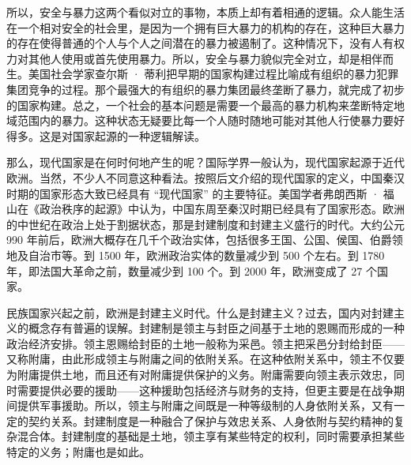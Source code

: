 所以，安全与暴力这两个看似对立的事物，本质上却有着相通的逻辑。众人能生活在一个相对安全的社会里，是因为一个拥有巨大暴力的机构的存在，这种巨大暴力的存在使得普通的个人与个人之间潜在的暴力被遏制了。这种情况下，没有人有权力对其他人使用或首先使用暴力。所以，安全与暴力貌似完全对立，却是相伴而生。美国社会学家查尔斯 · 蒂利把早期的国家构建过程比喻成有组织的暴力犯罪集团竞争的过程。那个最强大的有组织的暴力集团最终垄断了暴力，就完成了初步的国家构建。总之，一个社会的基本问题是需要一个最高的暴力机构来垄断特定地域范围内的暴力。这种状态无疑要比每一个人随时随地可能对其他人行使暴力要好得多。这是对国家起源的一种逻辑解读。


那么，现代国家是在何时何地产生的呢？国际学界一般认为，现代国家起源于近代欧洲。当然，不少人不同意这种看法。按照后文介绍的现代国家的定义，中国秦汉时期的国家形态大致已经具有 “现代国家” 的主要特征。美国学者弗朗西斯 · 福山在《政治秩序的起源》中认为，中国东周至秦汉时期已经具有了国家形态。欧洲的中世纪在政治上处于割据状态，那是封建制度和封建主义盛行的时代。大约公元 990 年前后，欧洲大概存在几千个政治实体，包括很多王国、公国、侯国、伯爵领地及自治市等。到 1500 年，欧洲政治实体的数量减少到 500 个左右。到 1780 年，即法国大革命之前，数量减少到 100 个。到 2000 年，欧洲变成了 27 个国家。

民族国家兴起之前，欧洲是封建主义时代。什么是封建主义？过去，国内对封建主义的概念存有普遍的误解。封建制是领主与封臣之间基于土地的恩赐而形成的一种政治经济安排。领主恩赐给封臣的土地一般称为采邑。领主把采邑分封给封臣——又称附庸，由此形成领主与附庸之间的依附关系。在这种依附关系中，领主不仅要为附庸提供土地，而且还有对附庸提供保护的义务。附庸需要向领主表示效忠，同时需要提供必要的援助——这种援助包括经济与财务的支持，但更主要是在战争期间提供军事援助。所以，领主与附庸之间既是一种等级制的人身依附关系，又有一定的契约关系。封建制度是一种融合了保护与效忠关系、人身依附与契约精神的复杂混合体。封建制度的基础是土地，领主享有某些特定的权利，同时需要承担某些特定的义务；附庸也是如此。

